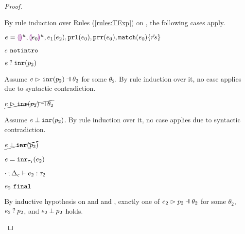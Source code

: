 \begin{proof}
\begin{byCases}
    By rule induction over Rules (\ref{rules:TExp}) on , the following cases apply.
    \begin{byCases}
    \item[\text{(\ref{rule:TEHole}),(\ref{rule:THole}),(\ref{rule:TAp}),(\ref{rule:TPrl}),(\ref{rule:TPrr}),(\ref{rule:TMatchZPre}),(\ref{rule:TMatchNZPre})}]
        \begin{pfsteps*}
        \item $e=\textcolor{violet}{\llparenthesis}\textcolor{violet}{\rrparenthesis}^{u},\textcolor{violet}{\llparenthesis} e_0\textcolor{violet}{\rrparenthesis}^{u},e_1(e_2),\mathtt{prl}(e_0),\mathtt{prr}(e_0),\mathtt{match}(e_0) \{\hat{rs}\}$ 
        \item $e ~\mathtt{notintro}$  
        \item $e \mathbin{?} \mathtt{inr}(p_2)$ 
        \end{pfsteps*}
        Assume $\hpatmatch{e}{\hinrp{p_2}}{\theta_2}$ for some $\theta_2$. By rule induction over it, no case applies due to syntactic contradiction.
        \begin{pfsteps*}
        \item $\cancel{\hpatmatch{e}{\hinrp{p_2}}{\theta_2}}$ 
        \end{pfsteps*}
        Assume $e \mathbin{\bot} \mathtt{inr}(p_2)$. By rule induction over it, no case applies due to syntactic contradiction.
        \begin{pfsteps*}
        \item $\cancel{e \mathbin{\bot} \mathtt{inr}(p_2)}$ 
        \end{pfsteps*}
    \item[\text{(\ref{rule:TInr})}]
        \begin{pfsteps*}
        \item $e=\mathtt{inr}_{\tau_1}({e_2})$ 
        \item $\cdot \mathbin{;} \Delta_e \vdash e_2 : \tau_2$  
        \item $e_2 ~\mathtt{final}$  
        \end{pfsteps*}
        By inductive hypothesis on  and  and , exactly one of $\hpatmatch{e_2}{p_2}{\theta_2}$ for some $\theta_2$, $e_2 \mathbin{?} p_2$, and $e_2 \mathbin{\bot} p_2$ holds.\\

\end{byCases}
\end{byCases}
\end{proof}
